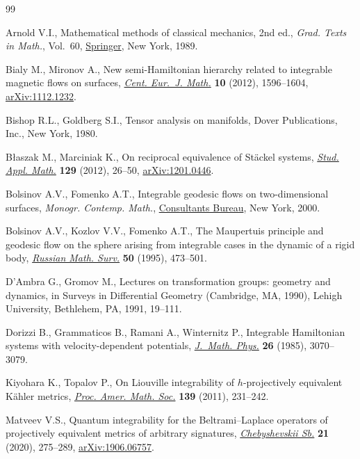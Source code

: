 \begin{thebibliography}{99}
\footnotesize\itemsep=0pt

Arnold V.I., Mathematical methods of classical mechanics, 2nd ed., \textit{Grad. Texts
  in Math.}, Vol.~60, \href{https://doi.org/10.1007/978-1-4757-2063-1}{Springer}, New York, 1989.

Bialy M., Mironov A., New semi-{H}amiltonian hierarchy related to integrable
  magnetic flows on surfaces, \href{https://doi.org/10.2478/s11533-012-0045-3}{\textit{Cent. Eur.~J. Math.}} \textbf{10} (2012),
  1596--1604, \href{https://arxiv.org/abs/1112.1232}{arXiv:1112.1232}.

Bishop R.L., Goldberg S.I., Tensor analysis on manifolds, Dover Publications,
  Inc., New York, 1980.

B{\l}aszak M., Marciniak K., On reciprocal equivalence of {S}t\"ackel systems,
  \href{https://doi.org/10.1111/j.1467-9590.2011.00544.x}{\textit{Stud. Appl. Math.}} \textbf{129} (2012), 26--50, \href{https://arxiv.org/abs/1201.0446}{arXiv:1201.0446}.

Bolsinov A.V., Fomenko A.T., Integrable geodesic flows on two-dimensional
  surfaces, \textit{Monogr. Contemp. Math.}, \href{https://doi.org/10.1007/978-1-4615-4307-7}{Consultants Bureau}, New York, 2000.

Bolsinov A.V., Kozlov V.V., Fomenko A.T., The Maupertuis principle and geodesic
  flow on the sphere arising from integrable cases in the dynamic of a rigid
  body, \href{https://doi.org/10.1070/RM1995v050n03ABEH002100}{\textit{Russian Math. Surv.}} \textbf{50} (1995), 473--501.

D'Ambra G., Gromov M., Lectures on transformation groups: geometry and
  dynamics, in Surveys in Differential Geometry ({C}ambridge, {MA}, 1990),
  Lehigh University, Bethlehem, PA, 1991, 19--111.

Dorizzi B., Grammaticos B., Ramani A., Winternitz P., Integrable {H}amiltonian
  systems with velocity-dependent potentials, \href{https://doi.org/10.1063/1.526685}{\textit{J.~Math. Phys.}}
  \textbf{26} (1985), 3070--3079.

Kiyohara K., Topalov P., On {L}iouville integrability of {$h$}-projectively
  equivalent {K}\"ahler metrics, \href{https://doi.org/10.1090/S0002-9939-2010-10576-2}{\textit{Proc. Amer. Math. Soc.}} \textbf{139}
  (2011), 231--242.

Matveev V.S., Quantum integrability for the {B}eltrami--{L}aplace operators of
  projectively equivalent metrics of arbitrary signatures,
  \href{https://doi.org/10.22405/2226-8383-2020-21-2-275-289}{\textit{Chebyshevskii Sb.}} \textbf{21} (2020), 275--289, \href{https://arxiv.org/abs/1906.06757}{arXiv:1906.06757}.


\end{thebibliography}
